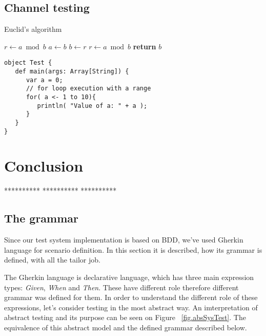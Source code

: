 \documentclass[conference]{IEEEtran}
\begin{document}
\subsection{Channel testing}

\begin{algorithm}
    \caption{Euclid’s algorithm}\label{euclid}
    \begin{algorithmic}[1]
        \State $r\gets a\bmod b$
            \State $a\gets b$
            \State $b\gets r$
            \State $r\gets a\bmod b$
        \EndWhile\label{euclidendwhile}
        \State \textbf{return} $b$
        \EndProcedure
    \end{algorithmic}
\end{algorithm}

\begin{lstlisting}[style=myScalastyle]
object Test {
   def main(args: Array[String]) {
      var a = 0;
      // for loop execution with a range
      for( a <- 1 to 10){
         println( "Value of a: " + a );
      }
   }
}
\end{lstlisting}


\section{Conclusion}

**********
**********
**********

\subsection{The grammar}
Since our test system implementation is based on BDD, we've used Gherkin language for scenario definition. In this section it is described, how its grammar is defined, with all the tailor job.

The Gherkin language is declarative language, which has three main expression types: \textit{Given}, \textit{When} and \textit{Then}. These have different role therefore different grammar was defined for them. In order to understand the different role of these expressions, let's consider testing in the most abstract way. An imterpretation of abstract testing and its purpose can be seen on Figure ~\ref{fig.absSysTest}. The equivalence of this abstract model and the defined grammar described below.
\end{document}
